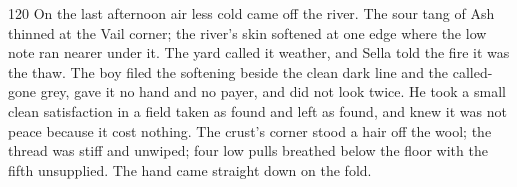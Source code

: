 \begin{CRchronicle}{120}
On the last afternoon air less cold came off the river. The sour tang of Ash thinned at the Vail corner; the river’s skin softened at one edge where the low note ran nearer under it. The yard called it weather, and Sella told the fire it was the thaw. The boy filed the softening beside the clean dark line and the called-gone grey, gave it no hand and no payer, and did not look twice. He took a small clean satisfaction in a field taken as found and left as found, and knew it was not peace because it cost nothing. The crust’s corner stood a hair off the wool; the thread was stiff and unwiped; four low pulls breathed below the floor with the fifth unsupplied. The hand came straight down on the fold.
\end{CRchronicle}
